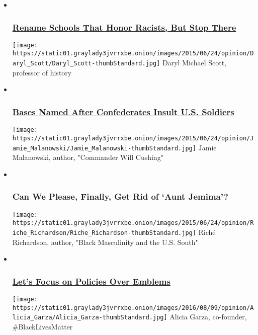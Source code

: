 \begin{itemize}
\item ~
  \hypertarget{rename-schools-that-honor-racists-but-stop-there}{%
  \subsubsection{\texorpdfstring{\href{rename-public-schools-that-honor-racists-but-stop-there}{Rename
  Schools That Honor Racists, But Stop
  There}}{Rename Schools That Honor Racists, But Stop There}}\label{rename-schools-that-honor-racists-but-stop-there}}

  \texttt{[image: https://static01.graylady3jvrrxbe.onion/images/2015/06/24/opinion/Daryl\_Scott/Daryl\_Scott-thumbStandard.jpg]}
  Daryl Michael Scott, professor of history
\item ~
  \hypertarget{bases-named-after-confederates-insult-us-soldiers-1}{%
  \subsubsection{\texorpdfstring{\href{bases-named-after-confederates-are-an-insult-to-us-soldiers}{Bases
  Named After Confederates Insult U.S.
  Soldiers}}{Bases Named After Confederates Insult U.S. Soldiers}}\label{bases-named-after-confederates-insult-us-soldiers-1}}

  \texttt{[image: https://static01.graylady3jvrrxbe.onion/images/2015/06/24/opinion/Jamie\_Malanowski/Jamie\_Malanowski-thumbStandard.jpg]}
  Jamie Malanowski, author, "Commander Will Cushing"
\item ~
  \hypertarget{can-we-please-finally-get-rid-of-aunt-jemima-1}{%
  \subsubsection{Can We Please, Finally, Get Rid of `Aunt
  Jemima'?}\label{can-we-please-finally-get-rid-of-aunt-jemima-1}}

  \texttt{[image: https://static01.graylady3jvrrxbe.onion/images/2015/06/24/opinion/Riche\_Richardson/Riche\_Richardson-thumbStandard.jpg]}
  Riché Richardson, author, "Black Masculinity and the U.S. South"
\item ~
  \hypertarget{lets-focus-on-policies-over-emblems-1}{%
  \subsubsection{\texorpdfstring{\href{lets-focus-instead-policies-that-enforce-structural-racism}{Let's
  Focus on Policies Over
  Emblems}}{Let's Focus on Policies Over Emblems}}\label{lets-focus-on-policies-over-emblems-1}}

  \texttt{[image: https://static01.graylady3jvrrxbe.onion/images/2016/08/09/opinion/Alicia\_Garza/Alicia\_Garza-thumbStandard.jpg]}
  Alicia Garza, co-founder, \#BlackLivesMatter
\end{itemize}

